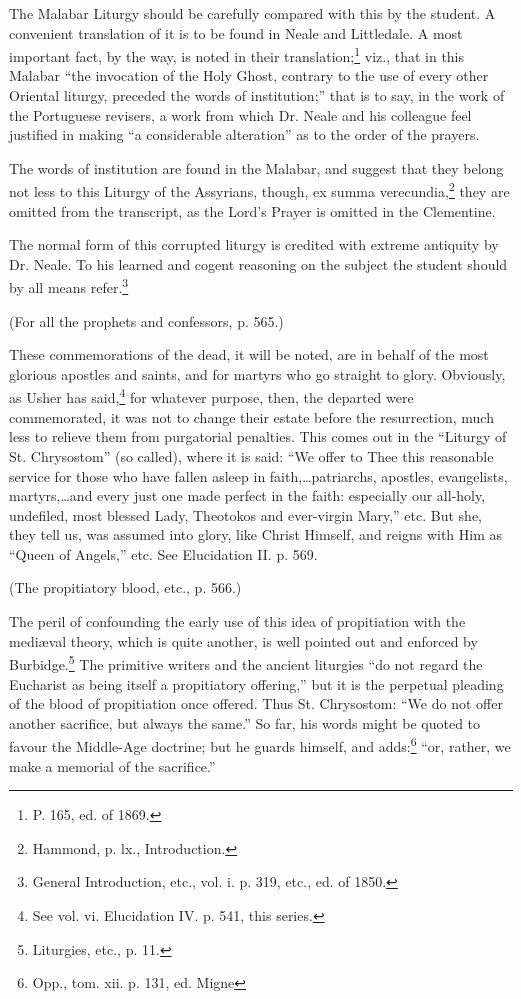 The Malabar Liturgy should be carefully compared with this by the student. A convenient translation of it is to be found in Neale and Littledale. A most important fact, by the way, is noted in their translation;\footnote{\par  P. 165, ed. of 1869.} viz., that in this Malabar “the invocation of the Holy Ghost, contrary to the use of every other Oriental liturgy, preceded the words of institution;” that is to say, in the work of the Portuguese revisers, a work from which Dr. Neale and his colleague feel justified in making “a considerable alteration” as to the order of the prayers.

The words of institution are found in the Malabar, and suggest that they belong not less to this Liturgy of the Assyrians, though, ex summa verecundia,\footnote{\par  Hammond, p. lx., Introduction.} they are omitted from the transcript, as the Lord’s Prayer is omitted in the Clementine.

The normal form of this corrupted liturgy is credited with extreme antiquity by Dr. Neale. To his learned and cogent reasoning on the subject the student should by all means refer.\footnote{\par  General Introduction, etc., vol. i. p. 319, etc., ed. of 1850.}

(For all the prophets and confessors, p. 565.)

These commemorations of the dead, it will be noted, are in behalf of the most glorious apostles and saints, and for martyrs who go straight to glory. Obviously, as Usher has said,\footnote{\par  See vol. vi. Elucidation IV. p. 541, this series.} for whatever purpose, then, the departed were commemorated, it was not to change their estate before the resurrection, much less to relieve them from purgatorial penalties. This comes out in the “Liturgy of St. Chrysostom” (so called), where it is said: “We offer to Thee this reasonable service for those who have fallen asleep in faith,…patriarchs, apostles, evangelists, martyrs,…and every just one made perfect in the faith: especially our all-holy, undefiled, most blessed Lady, Theotokos and ever-virgin Mary,” etc. But she, they tell us, was assumed into glory, like Christ Himself, and reigns with Him as “Queen of Angels,” etc. See Elucidation II. p. 569.

(The propitiatory blood, etc., p. 566.)

The peril of confounding the early use of this idea of propitiation with the mediæval theory, which is quite another, is well pointed out and enforced by Burbidge.\footnote{\par  Liturgies, etc., p. 11.} The primitive writers and the ancient liturgies “do not regard the Eucharist as being itself a propitiatory offering,” but it is the perpetual pleading of the blood of propitiation once offered. Thus St. Chrysostom: “We do not offer another sacrifice, but always the same.” So far, his words might be quoted to favour the Middle-Age doctrine; but he guards himself, and adds:\footnote{\par  Opp., tom. xii. p. 131, ed. Migne} “or, rather, we make a memorial of the sacrifice.”

